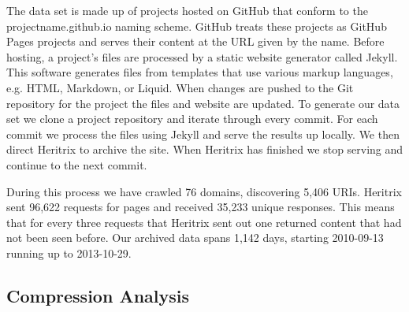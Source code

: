 \documentclass[11pt]{article}
\begin{document}
The data set is made up of projects hosted on GitHub that conform to the projectname.github.io naming scheme. GitHub treats these projects as GitHub Pages projects and serves their content at the URL given by the name. Before hosting, a project's files are processed by a static website generator called Jekyll\footnotemark. This software generates files from templates that use various markup languages, e.g. HTML, Markdown, or Liquid. When changes are pushed to the Git repository for the project the files and website are updated. To generate our data set we clone a project repository and iterate through every commit. For each commit we process the files using Jekyll and serve the results up locally. We then direct Heritrix to archive the site. When Heritrix has finished we stop serving and continue to the next commit.

During this process we have crawled 76 domains, discovering 5,406 URIs. Heritrix sent 96,622 requests for pages and received 35,233 unique responses. This means that for every three requests that Heritrix sent out one returned content that had not been seen before. Our archived data spans 1,142 days, starting 2010-09-13 running up to 2013-10-29.



\subsection{Compression Analysis}
\end{document}
